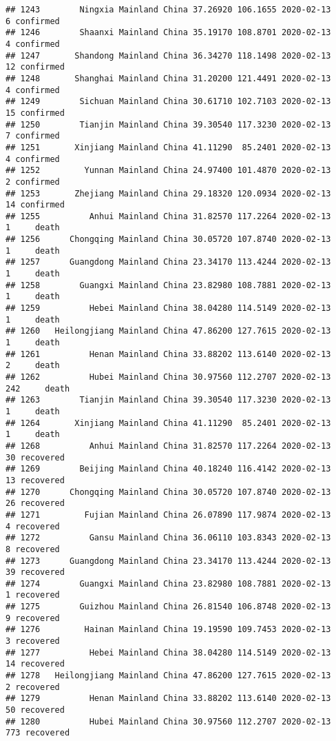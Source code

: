 \documentclass[
]{article}
\begin{document}
\begin{verbatim}
## 1243        Ningxia Mainland China 37.26920 106.1655 2020-02-13     6 confirmed
## 1246        Shaanxi Mainland China 35.19170 108.8701 2020-02-13     4 confirmed
## 1247       Shandong Mainland China 36.34270 118.1498 2020-02-13    12 confirmed
## 1248       Shanghai Mainland China 31.20200 121.4491 2020-02-13     4 confirmed
## 1249        Sichuan Mainland China 30.61710 102.7103 2020-02-13    15 confirmed
## 1250        Tianjin Mainland China 39.30540 117.3230 2020-02-13     7 confirmed
## 1251       Xinjiang Mainland China 41.11290  85.2401 2020-02-13     4 confirmed
## 1252         Yunnan Mainland China 24.97400 101.4870 2020-02-13     2 confirmed
## 1253       Zhejiang Mainland China 29.18320 120.0934 2020-02-13    14 confirmed
## 1255          Anhui Mainland China 31.82570 117.2264 2020-02-13     1     death
## 1256      Chongqing Mainland China 30.05720 107.8740 2020-02-13     1     death
## 1257      Guangdong Mainland China 23.34170 113.4244 2020-02-13     1     death
## 1258        Guangxi Mainland China 23.82980 108.7881 2020-02-13     1     death
## 1259          Hebei Mainland China 38.04280 114.5149 2020-02-13     1     death
## 1260   Heilongjiang Mainland China 47.86200 127.7615 2020-02-13     1     death
## 1261          Henan Mainland China 33.88202 113.6140 2020-02-13     2     death
## 1262          Hubei Mainland China 30.97560 112.2707 2020-02-13   242     death
## 1263        Tianjin Mainland China 39.30540 117.3230 2020-02-13     1     death
## 1264       Xinjiang Mainland China 41.11290  85.2401 2020-02-13     1     death
## 1268          Anhui Mainland China 31.82570 117.2264 2020-02-13    30 recovered
## 1269        Beijing Mainland China 40.18240 116.4142 2020-02-13    13 recovered
## 1270      Chongqing Mainland China 30.05720 107.8740 2020-02-13    26 recovered
## 1271         Fujian Mainland China 26.07890 117.9874 2020-02-13     4 recovered
## 1272          Gansu Mainland China 36.06110 103.8343 2020-02-13     8 recovered
## 1273      Guangdong Mainland China 23.34170 113.4244 2020-02-13    39 recovered
## 1274        Guangxi Mainland China 23.82980 108.7881 2020-02-13     1 recovered
## 1275        Guizhou Mainland China 26.81540 106.8748 2020-02-13     9 recovered
## 1276         Hainan Mainland China 19.19590 109.7453 2020-02-13     3 recovered
## 1277          Hebei Mainland China 38.04280 114.5149 2020-02-13    14 recovered
## 1278   Heilongjiang Mainland China 47.86200 127.7615 2020-02-13     2 recovered
## 1279          Henan Mainland China 33.88202 113.6140 2020-02-13    50 recovered
## 1280          Hubei Mainland China 30.97560 112.2707 2020-02-13   773 recovered

\end{verbatim}
\end{document}
